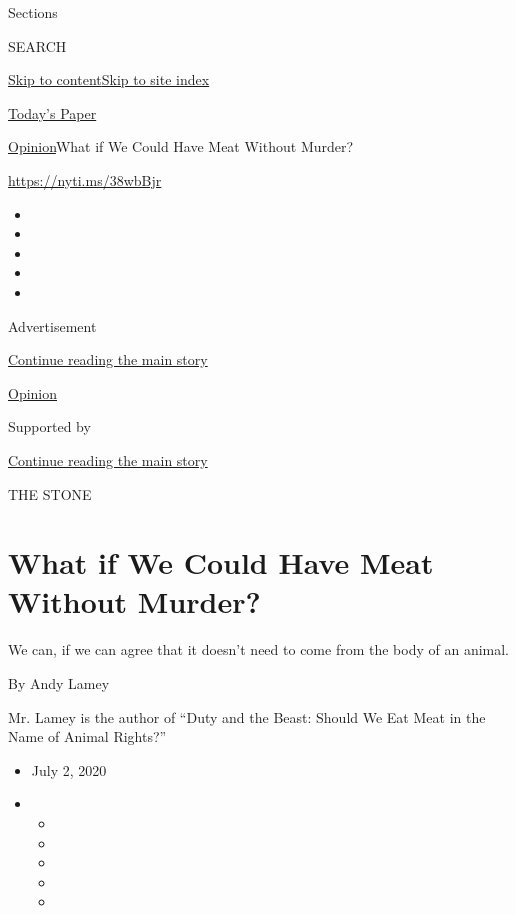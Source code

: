 Sections

SEARCH

\protect\hyperlink{site-content}{Skip to
content}\protect\hyperlink{site-index}{Skip to site index}

\href{https://myaccount.nytimes.com/auth/login?response_type=cookie\&client_id=vi}{}

\href{https://www.nytimes.com/section/todayspaper}{Today's Paper}

\href{/section/opinion}{Opinion}\textbar{}What if We Could Have Meat
Without Murder?

\href{https://nyti.ms/38wbBjr}{https://nyti.ms/38wbBjr}

\begin{itemize}
\item
\item
\item
\item
\item
\end{itemize}

Advertisement

\protect\hyperlink{after-top}{Continue reading the main story}

\href{/section/opinion}{Opinion}

Supported by

\protect\hyperlink{after-sponsor}{Continue reading the main story}

THE STONE

\hypertarget{what-if-we-could-have-meat-without-murder}{%
\section{What if We Could Have Meat Without
Murder?}\label{what-if-we-could-have-meat-without-murder}}

We can, if we can agree that it doesn't need to come from the body of an
animal.

By Andy Lamey

Mr. Lamey is the author of ``Duty and the Beast: Should We Eat Meat in
the Name of Animal Rights?''

\begin{itemize}
\item
  July 2, 2020
\item
  \begin{itemize}
  \item
  \item
  \item
  \item
  \item
  \end{itemize}
\end{itemize}

